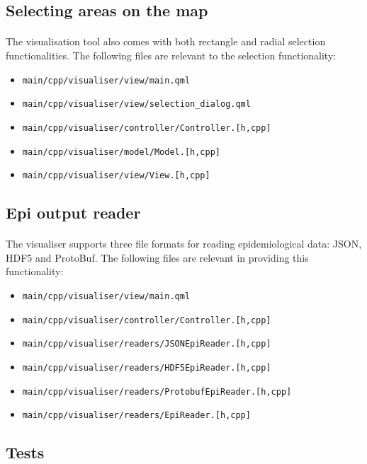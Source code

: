\documentclass{article}
\begin{document}
\subsection{Selecting areas on the map}

\paragraph{} The visualisation tool also comes with both rectangle and radial selection functionalities. The following files are relevant to the selection functionality:
\begin{itemize}
\item \texttt{main/cpp/visualiser/view/main.qml}
\item \texttt{main/cpp/visualiser/view/selection\_dialog.qml}
\item \texttt{main/cpp/visualiser/controller/Controller.[h,cpp]}
\item \texttt{main/cpp/visualiser/model/Model.[h,cpp]}
\item \texttt{main/cpp/visualiser/view/View.[h,cpp]}
\end{itemize}

\subsection{Epi output reader}

\paragraph{} The visualiser supports three file formats for reading epidemiological data: JSON, HDF5 and ProtoBuf. The following files are relevant in providing this functionality:
\begin{itemize}
\item \texttt{main/cpp/visualiser/view/main.qml}
\item \texttt{main/cpp/visualiser/controller/Controller.[h,cpp]}
\item \texttt{main/cpp/visualiser/readers/JSONEpiReader.[h,cpp]}
\item \texttt{main/cpp/visualiser/readers/HDF5EpiReader.[h,cpp]}
\item \texttt{main/cpp/visualiser/readers/ProtobufEpiReader.[h,cpp]}
\item \texttt{main/cpp/visualiser/readers/EpiReader.[h,cpp]}
\end{itemize}

\subsection{Tests}
\end{document}
